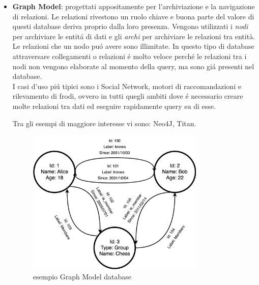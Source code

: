 \begin{itemize}
    \item \textbf{Graph Model}: progettati appositamente per l'archiviazione e la navigazione di relazioni. Le relazioni rivestono un ruolo chiave
    e buona parte del valore di questi database deriva proprio dalla loro presenza. Vengono utilizzati i \emph{nodi} per archiviare le entitá
    di dati e gli \emph{archi} per archiviare le relazioni tra entità. Le relazioni che un nodo puó avere sono illimitate.
    In questo tipo di database attraversare collegamenti o relazioni é molto veloce perché le relazioni tra i nodi non vengono elaborate al momento
    della query, ma sono giá presenti nel database.\\
    I casi d'uso piú tipici sono i Social Network, motori di raccomandazioni e rilevamento di frodi, ovvero in tutti quegli ambiti dove é
    necessario creare molte relazioni tra dati ed eseguire rapidamente query su di esse.

    Tra gli esempi di maggiore interesse vi sono: Neo4J, Titan.
    \begin{figure}[H]
        \begin{center}
            \includegraphics[width=0.8\textwidth]{img/dbGrafo}
        \end{center}
    \caption{esempio Graph Model database}
    \end{figure}
\end{itemize}
